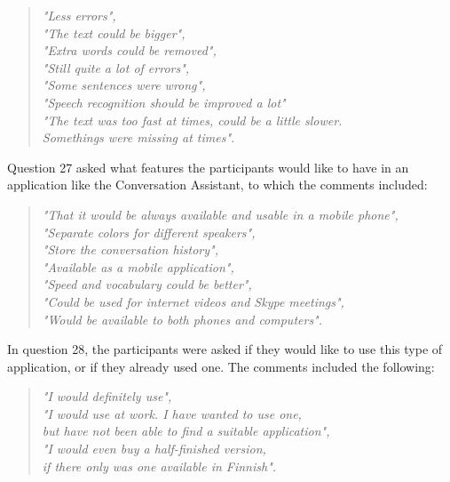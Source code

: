 \documentclass[english, 12pt, a4paper, pdftex, elec, utf8]{aaltothesis}
\renewcommand{\baselinestretch}{1.02}
\begin{document}
\begin{quote}
	\centering
	\renewcommand{\baselinestretch}{1.5}
	\textit{
		"Less errors", \\
		"The text could be bigger", \\
		"Extra words could be removed", \\
		"Still quite a lot of errors", \\
		"Some sentences were wrong", \\
		"Speech recognition should be improved a lot" \\
		"The text was too fast at times, could be a little slower. \\ Somethings were missing at times".}
\end{quote}
\vspace{2mm}
Question 27 asked what features the participants would like to have in an application like the Conversation Assistant, to which the comments included:
\begin{quote}
	\centering
	\renewcommand{\baselinestretch}{1.5}
	\textit{
		"That it would be always available and usable in a mobile phone", \\
		"Separate colors for different speakers", \\
		"Store the conversation history", \\
		"Available as a mobile application", \\
		"Speed and vocabulary could be better", \\
		"Could be used for internet videos and Skype meetings", \\
		\vspace{2mm}
		"Would be available to both phones and computers".}
\end{quote}
\vspace{2mm}
In question 28, the participants were asked if they would like to use this type of application, or if they already used one. The comments included the following:
\begin{quote}
	\centering
	\renewcommand{\baselinestretch}{1.5}
	\textit{
		"I would definitely use", \\
		"I would use at work. I have wanted to use one, \\ \vspace{-2.5mm} but have not been able to find a suitable application", \\
		\vspace{2mm}
		"I would even buy a half-finished version, \\ if there only was one available in Finnish".}
\end{quote}
\end{document}
